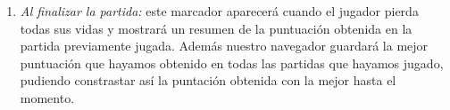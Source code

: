 \documentclass[12zpt]{article}
\begin{document}
\begin{enumerate}
	\item \textit{Al finalizar la partida:} este marcador aparecerá cuando el jugador pierda todas sus vidas y mostrará un resumen de la puntuación obtenida en la partida 
	previamente jugada. Además nuestro navegador guardará la mejor puntuación que hayamos obtenido en todas las partidas que hayamos jugado, pudiendo constrastar así la puntación 
	obtenida con la mejor hasta el momento.
\end{enumerate}
\noindent{}

\end{document}
